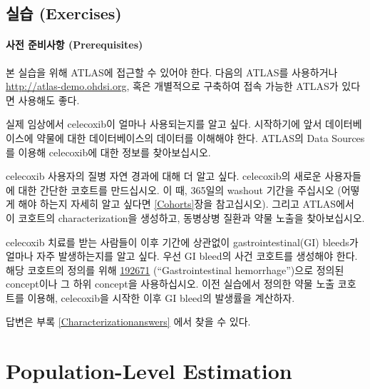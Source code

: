 \documentclass[11pt]{book}
\theoremstyle{definition}
\theoremstyle{definition}
\theoremstyle{definition}
\theoremstyle{remark}
\let\BeginKnitrBlock\begin \let\EndKnitrBlock\end
\begin{document}
\section{실습 (Exercises)}\label{-exercises}

\subsubsection*{사전 준비사항 (Prerequisites)}\label{--prerequisites}

본 실습을 위해 ATLAS에 접근할 수 있어야 한다. 다음의 ATLAS를 사용하거나
\url{http://atlas-demo.ohdsi.org}, 혹은 개별적으로 구축하여 접속 가능한
ATLAS가 있다면 사용해도 좋다.

\BeginKnitrBlock{exercise}
\protect\hypertarget{exr:exerciseCharacterization1}{}{\label{exr:exerciseCharacterization1}
}실제 임상에서 celecoxib이 얼마나 사용되는지를 알고 싶다. 시작하기에
앞서 데이터베이스에 약물에 대한 데이터베이스의 데이터를 이해해야 한다.
ATLAS의 Data Sources를 이용해 celecoxib에 대한 정보를 찾아보십시오.
\EndKnitrBlock{exercise}

\BeginKnitrBlock{exercise}
\protect\hypertarget{exr:exerciseCharacterization2}{}{\label{exr:exerciseCharacterization2}
}celecoxib 사용자의 질병 자연 경과에 대해 더 알고 싶다. celecoxib의
새로운 사용자들에 대한 간단한 코호트를 만드십시오. 이 때, 365일의
washout 기간을 주십시오 (어떻게 해야 하는지 자세히 알고 싶다면
\ref{Cohorts}장을 참고십시오). 그리고 ATLAS에서 이 코호트의
characterization을 생성하고, 동병상병 질환과 약물 노출을 찾아보십시오.
\EndKnitrBlock{exercise}

\BeginKnitrBlock{exercise}
\protect\hypertarget{exr:exerciseCharacterization3}{}{\label{exr:exerciseCharacterization3}
}celecoxib 치료를 받는 사람들이 이후 기간에 상관없이
gastrointestinal(GI) bleeds가 얼마나 자주 발생하는지를 알고 싶다. 우선
GI bleed의 사건 코호트를 생성해야 한다. 해당 코호트의 정의를 위해
\href{http://athena.ohdsi.org/search-terms/terms/192671}{192671}
(``Gastrointestinal hemorrhage'')으로 정의된 concept이나 그 하위
concept을 사용하십시오. 이전 실습에서 정의한 약물 노출 코호트를 이용해,
celecoxib을 시작한 이후 GI bleed의 발생률을 계산하자.
\EndKnitrBlock{exercise}

답변은 부록 \ref{Characterizationanswers} 에서 찾을 수 있다.

\chapter{Population-Level Estimation}\label{PopulationLevelEstimation}
\end{document}

